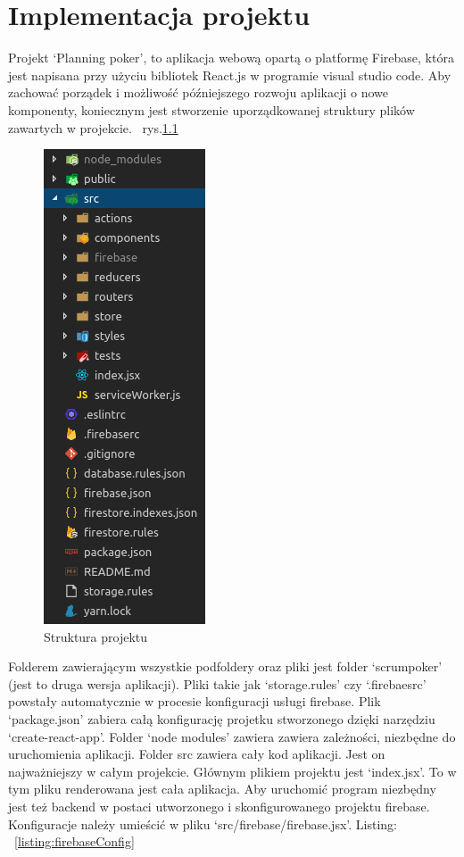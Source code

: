 \chapter{Implementacja projektu}

Projekt `Planning poker', to aplikacja webową opartą o platformę Firebase,
która jest napisana przy użyciu bibliotek React.js w programie visual studio code.
Aby zachować porządek i możliwość późniejszego rozwoju aplikacji o nowe komponenty,
koniecznym jest stworzenie uporządkowanej struktury plików zawartych w projekcie.
~rys.\ref{rys:projekt}
\begin{figure}
	\centering\includegraphics[width=.2\textwidth]{img/projekt}
	\caption{Struktura projektu}\label{rys:projekt}%
\end{figure}
Folderem zawierającym wszystkie podfoldery oraz pliki jest folder `scrumpoker' (jest to druga wersja aplikacji).
Pliki takie jak `storage.rules' czy `.firebaesrc' powstały automatycznie w procesie konfiguracji usługi firebase.
Plik `package.json' zabiera całą konfigurację projetku stworzonego dzięki narzędziu `create-react-app'.
Folder `node modules' zawiera zawiera zależności, niezbędne do uruchomienia aplikacji.
    Folder src zawiera cały kod aplikacji. Jest on najważniejszy w całym projekcie.
Głównym plikiem projektu jest `index.jsx'. To w tym pliku renderowana jest cała aplikacja.
Aby uruchomić program niezbędny jest też backend w postaci utworzonego i skonfigurowanego projektu firebase.
Konfiguracje należy umieścić w pliku `src/firebase/firebase.jsx'. Listing:
~\ref{listing:firebaseConfig} 

